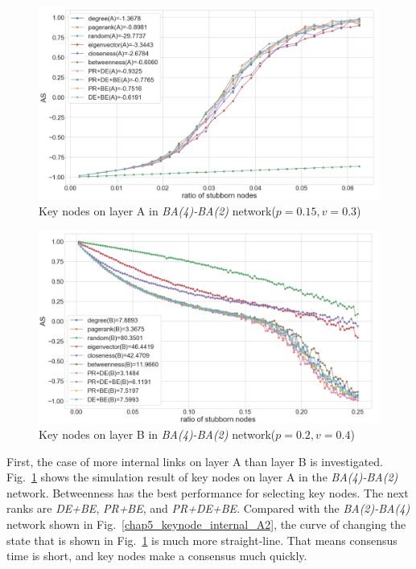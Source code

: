 \begin{figure}[!htb]
	\centering
	\includegraphics[width=\hsize]{figure/chap5_keynode_internal_A.png}
	\caption{Key nodes on layer A in \textit{BA(4)-BA(2)} network($p=0.15, v=0.3$)}
	\label{chap5_keynode_internal_A}
\end{figure}
\begin{figure}[!htb]
	\centering
	\includegraphics[width=\hsize]{figure/chap5_keynode_internal_B.png}
	\caption{Key nodes on layer B in \textit{BA(4)-BA(2)} network($p=0.2, v=0.4$)}
	\label{chap5_keynode_internal_B}
\end{figure}

First, the case of more internal links on layer A than layer B is investigated. Fig.~\ref{chap5_keynode_internal_A} shows the simulation result of key nodes on layer A in the \textit{BA(4)-BA(2)} network. Betweenness has the best performance for selecting key nodes. The next ranks are \textit{DE+BE}, \textit{PR+BE}, and \textit{PR+DE+BE}. Compared with the \textit{BA(2)-BA(4)} network shown in Fig.~\ref{chap5_keynode_internal_A2}, the curve of changing the state that is shown in Fig.~\ref{chap5_keynode_internal_A} is much more straight-line. That means consensus time is short, and key nodes make a consensus much quickly.

